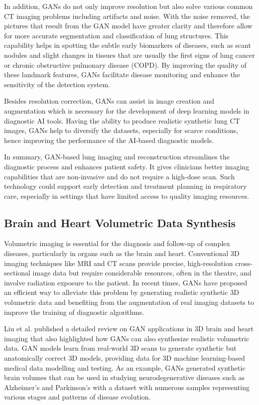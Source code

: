 \documentclass[12pt]{article}
\begin{document}
In addition, GANs do not only improve resolution but also solve various common CT imaging problems including artifacts and noise. With the noise removed, the pictures that result from the GAN model have greater clarity and therefore allow for more accurate segmentation and classification of lung structures. This capability helps in spotting the subtle early biomarkers of diseases, such as scant nodules and slight changes in tissues that are usually the first signs of lung cancer or chronic obstructive pulmonary disease (COPD). By improving the quality of these landmark features, GANs facilitate disease monitoring and enhance the sensitivity of the detection system.

Besides resolution correction, GANs can assist in image creation and augmentation which is necessary for the development of deep learning models in diagnostic AI tools. Having the ability to produce realistic synthetic lung CT images, GANs help to diversify the datasets, especially for scarce conditions, hence improving the performance of the AI-based diagnostic models.

In summary, GAN-based lung imaging and reconstruction streamlines the diagnostic process and enhances patient safety. It gives clinicians better imaging capabilities that are non-invasive and do not require a high-dose scan. Such technology could support early detection and treatment planning in respiratory care, especially in settings that have limited access to quality imaging resources.

\subsection{Brain and Heart Volumetric Data Synthesis}
Volumetric imaging is essential for the diagnosis and follow-up of complex diseases, particularly in organs such as the brain and heart. Conventional 3D imaging techniques like MRI and CT scans provide precise, high-resolution cross-sectional image data but require considerable resources, often in the theatre, and involve radiation exposure to the patient. In recent times, GANs have proposed an efficient way to alleviate this problem by generating realistic synthetic 3D volumetric data and benefiting from the augmentation of real imaging datasets to improve the training of diagnostic algorithms.

Liu et al. \cite{Liu2024} published a detailed review on GAN applications in 3D brain and heart imaging that also highlighted how GANs can also synthesize realistic volumetric data. GAN models learn from real-world 3D scans to generate synthetic but anatomically correct 3D models, providing data for 3D machine learning-based medical data modelling and testing. As an example, GANs generated synthetic brain volumes that can be used in studying neurodegenerative diseases such as Alzheimer's and Parkinson's with a dataset with numerous samples representing various stages and patterns of disease evolution.
\end{document}
